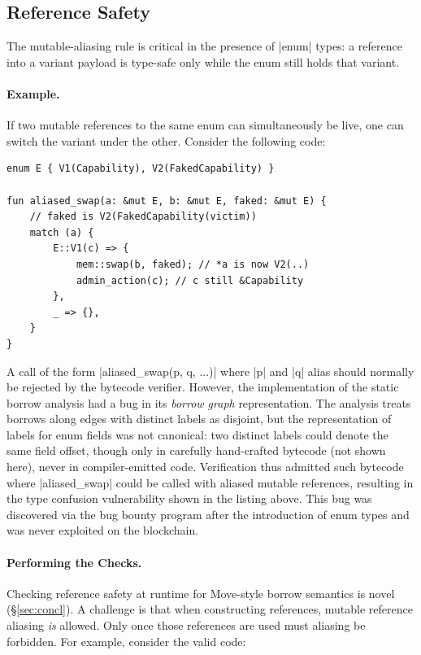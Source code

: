 \subsection{Reference Safety}
\label{sec:ref}

The mutable-aliasing rule is critical in the presence of |enum| types: a reference into a variant payload is type-safe only while the enum still holds that variant.

\paragraph{Example.}
If two mutable references to the same enum can simultaneously be live, one can switch the variant under the other.
Consider the following code:

\noindent\hfil\begin{minipage}{0.78\linewidth}
\begin{lstlisting}[language=Move,style=MoveStyle,basicstyle=\relsize{-2}\ttfamily,keywordstyle=\color{blue},frame=single,frameround=tttt,framesep=4pt,rulecolor=\color{gray!60},backgroundcolor=\color{gray!4}]
enum E { V1(Capability), V2(FakedCapability) }

fun aliased_swap(a: &mut E, b: &mut E, faked: &mut E) {
    // faked is V2(FakedCapability(victim))
    match (a) {
        E::V1(c) => {
            mem::swap(b, faked); // *a is now V2(..)
            admin_action(c); // c still &Capability
        },
        _ => {},
    }
}
\end{lstlisting}
\end{minipage}\hfil

\noindent A call of the form |aliased_swap(p, q, ...)| where |p| and |q| alias should normally be rejected by the bytecode verifier.
However, the implementation of the static borrow analysis had a bug in its \emph{borrow graph} representation.
The analysis treats borrows along edges with distinct labels as disjoint, but the representation of labels for enum fields was not canonical: two distinct labels could denote the same field offset, though only in carefully hand-crafted bytecode (not shown here), never in compiler-emitted code.
Verification thus admitted such bytecode where |aliased_swap| could be called with aliased mutable references, resulting in the type confusion vulnerability shown in the listing above.
This bug was discovered via the bug bounty program after the introduction of enum types and was never exploited on the blockchain.

\paragraph{Performing the Checks.}
Checking reference safety at runtime for Move-style borrow semantics is novel (\S\ref{sec:concl}).
A challenge is that when constructing references, mutable reference aliasing \emph{is} allowed.
Only once those references are used must aliasing be forbidden.
For example, consider the valid code:

